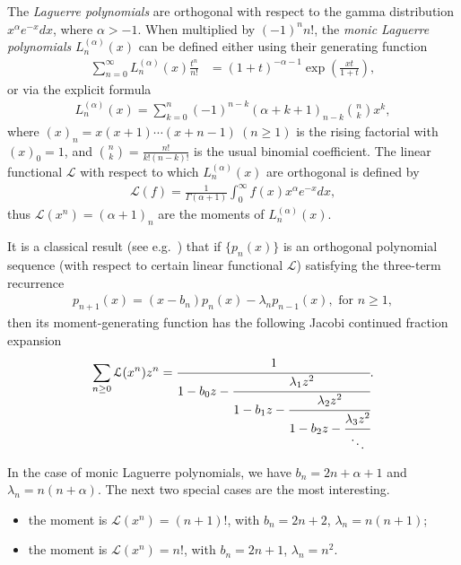 \documentclass[12pt]{amsart}
\numberwithin{equation}{section}
\theoremstyle{plain}
\theoremstyle{definition}
\begin{document}
The {\it Laguerre polynomials} \cite[Sect.~6.2]{AAR} are orthogonal with respect to the gamma distribution $x^{\alpha}e^{-x}dx$, where $\alpha >-1$. When multiplied by $(-1)^n n!$, the {\it monic Laguerre polynomials} $L_n^{(\alpha)}(x)$ can be defined either using their generating function
\begin{align*} %
\sum_{n=0}^{\infty}L_n^{(\alpha)}(x)\frac{t^n}{n!} &=(1+t)^{-\alpha-1}\exp(\frac{xt}{1+t}),
\end{align*}
or via the explicit formula
\begin{align*} %
L_n^{(\alpha)}(x)=\sum_{k=0}^{n}(-1)^{n-k}(\alpha+k+1)_{n-k}\binom{n}{k}x^k,
\end{align*}
where $(x)_n=x(x+1)\cdots(x+n-1)~(n\ge 1)$ is the rising factorial with $(x)_0=1$, and $\binom{n}{k}=\frac{n!}{k!(n-k)!}$ is the usual binomial coefficient. The linear functional $\mathcal{L}$ with respect to which $L_n^{(\alpha)}(x)$ are orthogonal is defined by
\begin{align*}
\mathcal{L}(f)=\frac{1}{\Gamma(\alpha+1)}\int_{0}^{\infty}f(x)x^{\alpha}e^{-x}dx,
\end{align*}
thus $\mathcal{L}(x^n)=(\alpha+1)_n$ are the moments of $L_n^{(\alpha)}(x)$.

It is a classical result (see e.g.~\cite[Thm.~5.8.2]{AAR}) that if $\{p_n(x)\}$ is an orthogonal polynomial sequence (with respect to certain linear functional $\mathcal{L}$) satisfying the three-term recurrence
\begin{align*}
p_{n+1}(x)=(x-b_n)p_n(x)-\lambda_np_{n-1}(x), \text{ for } n\ge 1,
\end{align*}
then its moment-generating function has the following Jacobi continued fraction expansion
\begin{align}
\label{moment-gf and cf}
\sum_{n\ge 0}\mathcal{L}(x^n)z^n=\cfrac{1}{1-b_0z-\cfrac{\lambda_1z^2}{1-b_1z-\cfrac{\lambda_2z^2}{1-b_2z-\cfrac{\lambda_3z^2}{\ddots}}}}.
\end{align}

In the case of monic Laguerre polynomials, we have $b_n=2n+\alpha+1$ and $\lambda_n=n(n+\alpha)$. The next two special cases are the most interesting.
\begin{itemize}
  \item[$\alpha=1$:] the moment is $\mathcal{L}(x^n)=(n+1)!$, with $b_n=2n+2$, $\lambda_n=n(n+1)$;
  \item[$\alpha=0$:] the moment is $\mathcal{L}(x^n)=n!$, with $b_n=2n+1$, $\lambda_n=n^2$.
\end{itemize}
\end{document}
